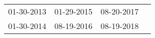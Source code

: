\begin{supertabular}{llll}
 01-30-2013 &  01-29-2015 &  08-20-2017 \\
 01-30-2014 &  08-19-2016 &  08-19-2018 \\
\end{supertabular}
